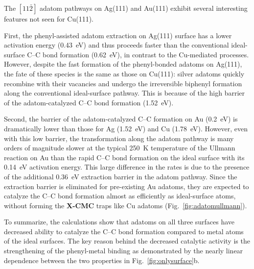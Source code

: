\documentclass[journal=jacsat,manuscript=article]{achemso}
\begin{document}
The $[11\bar{2}]$ adatom pathways on Ag(111) and Au(111) exhibit several interesting features not seen for Cu(111).

First, the phenyl-assisted adatom extraction on Ag(111) surface has a lower activation energy (\SI{0.43}{\electronvolt}) and thus proceeds faster than the conventional ideal-surface C--C bond formation (\SI{0.62}{\electronvolt}), in contrast to the Cu-mediated processes. However, despite the fast formation of the phenyl-bonded adatoms on Ag(111), the fate of these species is the same as those on Cu(111): silver adatoms quickly recombine with their vacancies and undergo the irreversible biphenyl formation along the conventional ideal-surface pathway. This is because of the high barrier of the adatom-catalyzed C--C bond formation (\SI{1.52}{\electronvolt}).

Second, the barrier of the adatom-catalyzed C--C formation on Au (\SI{0.2}{\electronvolt}) is dramatically lower than those for Ag (\SI{1.52}{\electronvolt}) and Cu (\SI{1.78}{\electronvolt}). 
However, even with this low barrier, the transformation along the adatom pathway is many orders of magnitude slower at the typical \SI{250}{\kelvin} temperature of the Ullmann reaction on Au than the rapid C--C bond formation on the ideal surface with its \SI{0.14}{\electronvolt} activation energy. This large difference in the rates is due to the presence of the additional \SI{0.36}{\electronvolt} extraction barrier in the adatom pathway. 
%
Since the extraction barrier is eliminated for pre-existing Au adatoms, they are expected to catalyze the C--C bond formation almost as efficiently as ideal-surface atoms, without forming the \textbf{X-CMC} traps like Cu adatoms (Fig.~\ref{fig:adatomullmann}).

To summarize, the calculations show that adatoms on all three surfaces have decreased ability to catalyze the C--C bond formation compared to metal atoms of the ideal surfaces. 
The key reason behind the decreased catalytic activity is the strengthening of the phenyl-metal binding as demonstrated by the nearly linear dependence between the two properties in Fig.~\ref{fig:onlysurface}b.
\end{document}
